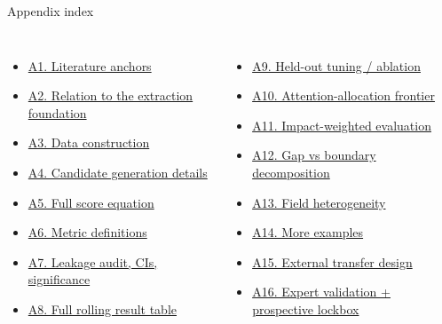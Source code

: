 \documentclass[aspectratio=169,11pt]{beamer}
\begin{document}
\begin{frame}[label=appendix-index]{Appendix index}
\small
\begin{columns}[T]
\begin{itemize}
  \item \hyperlink{app-lit}{A1. Literature anchors}
  \item \hyperlink{app-foundation}{A2. Relation to the extraction foundation}
  \item \hyperlink{app-data}{A3. Data construction}
  \item \hyperlink{app-candidate}{A4. Candidate generation details}
  \item \hyperlink{app-score}{A5. Full score equation}
  \item \hyperlink{app-metrics}{A6. Metric definitions}
  \item \hyperlink{app-leakage}{A7. Leakage audit, CIs, significance}
  \item \hyperlink{app-rolling}{A8. Full rolling result table}
\end{itemize}

\begin{itemize}
  \item \hyperlink{app-heldout}{A9. Held-out tuning / ablation}
  \item \hyperlink{app-attention}{A10. Attention-allocation frontier}
  \item \hyperlink{app-impact}{A11. Impact-weighted evaluation}
  \item \hyperlink{app-gap}{A12. Gap vs boundary decomposition}
  \item \hyperlink{app-heterogeneity}{A13. Field heterogeneity}
  \item \hyperlink{app-examples}{A14. More examples}
  \item \hyperlink{app-transfer}{A15. External transfer design}
  \item \hyperlink{app-lockbox}{A16. Expert validation + prospective lockbox}
\end{itemize}
\end{columns}
\end{frame}
\end{document}
